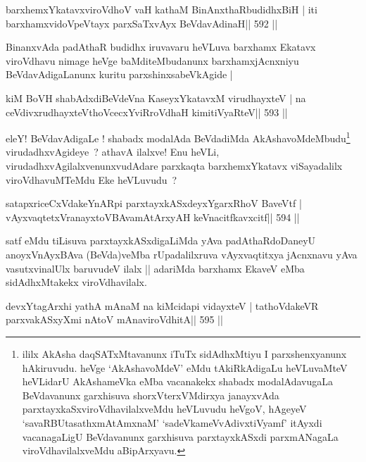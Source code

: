 

\begin{shl}
barxhemxYkatavxviroVdhoV vaH kathaM BinAnxthaRbudidhxBiH |
iti barxhamxvidoVpeVtayx parxSaTxvAyx BeVdavAdinaH\hfill || 592 ||
\end{shl}

\begin{artha}
BinanxvAda padAthaR budidhx iruvavaru heVLuva barxhamx Ekatavx
viroVdhavu nimage heVge baMditeMbudanunx barxhamxjAcnxniyu
BeVdavAdigaLanunx kuritu parxshinxsabeVkAgide |
\end{artha}

\begin{shl}
kiM BoVH shabAdxdiBeVdeVna KaseyxYkatavxM virudhayxteV |
na ceVdivxrudhayxteV\s thoVcecxYviRroVdhaH kimitiVyaRteV\hfill || 593 ||
\end{shl}

\begin{artha}
eleY! BeVdavAdigaLe ! shabadx modalAda BeVdadiMda
AkAshavoMdeMbudu\footnote{ililx AkAsha daqSATxMtavanunx iTuTx
  sidAdhxMtiyu I parxshenxyanunx hAkiruvudu. heVge `AkAshavoMdeV' eMdu
  tAkiRkAdigaLu heVLuvaMteV heVLidarU AkAshameVka eMba vacanakekx
  shabadx modalAdavugaLa BeVdavanunx garxhisuva shorxVterxVMdirxya
  janayxvAda parxtayxkaSxviroVdhavilalxveMdu heVLuvudu heVgoV, hAgeyeV
  `savaRBUtasathxmAtAmxnaM' `sadeVkameVvAdivxtiVyamf' itAyxdi
  vacanagaLigU BeVdavanunx garxhisuva parxtayxkASxdi parxmANagaLa
  viroVdhavilalxveMdu aBipArxyavu.} virudadhxvAgideye~? athavA ilalxve! Enu
heVLi, virudadhxvAgilalxvenunxvudAdare parxkaqta barxhemxYkatavx
viSayadalilx viroVdhavuMTeMdu Eke heVLuvudu~?
\end{artha}

\begin{shl}
satapxriceCxVdakeYnARpi parxtayxkASxdeyxYgarxRhoV BaveVtf |
vAyxvaqtetxVranayxtoVBAvamAtArxyAH keVnacitfkavxcitf\hfill || 594 ||
\end{shl}

\begin{artha}
satf eMdu tiLisuva parxtayxkASxdigaLiMda yAva padAthaRdoDaneyU anoyxVnAyxBAva (BeVda)veMba rUpadalilxruva vAyxvaqtitxya jAcnxnavu yAva vasutxvinalUlx baruvudeV ilalx ||  adariMda barxhamx EkaveV eMba sidAdhxMtakekx viroVdhavilalx.
\end{artha}

\begin{shl}
devxYtagArxhi yathA mAnaM na kiMcidapi vidayxteV |
tathoVdakeVR parxvakASxyXmi nAtoV mAnaviroVdhitA\hfill || 595 ||
\end{shl}

